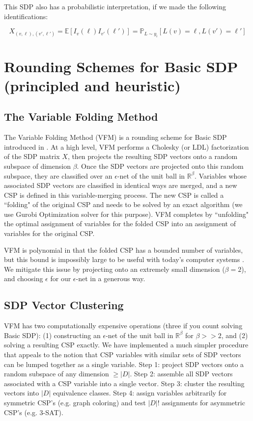 \documentclass[12pt]{article} %
\begin{document}
This SDP also has a probabilistic interpretation, if we made the following identifications:

\begin{equation}
X_{(v,\ell),(v',\ell')} = \mathbb{E}[I_v(\ell)I_{v'}(\ell')] = \mathbb{P}_{L\sim y_i}[L(v)=\ell, L(v')=\ell']
\end{equation}

\section{Rounding Schemes for Basic SDP (principled and heuristic)}


\subsection{The Variable Folding Method}

The Variable Folding Method (VFM) is a rounding scheme for Basic SDP introduced in \citet{raghavendra2009round}. At a high level, VFM performs a Cholesky (or LDL) factorization of the SDP matrix $X$, then projects the resulting SDP vectors onto a random subspace of dimension $\beta$. Once the SDP vectors are projected onto this random subspace, they are classified over an $\epsilon$-net of the unit ball in $\mathbb{R}^\beta$. Variables whose associated SDP vectors are classified in identical ways are merged, and a new CSP is defined in this variable-merging process. The new CSP is called a ``folding" of the original CSP and needs to be solved by an exact algorithm (we use Gurobi Optimization solver for this purpose). VFM completes by ``unfolding" the optimal assignment of variables for the folded CSP into an assignment of variables for the original CSP.

VFM is polynomial in that the folded CSP has a bounded number of variables, but this bound is impossibly large to be useful with today's computer systems \citep{dwivedi2015introduction}. We mitigate this issue by projecting onto an extremely small dimension ($\beta = 2$), and choosing $\epsilon$ for our $\epsilon$-net in a generous way.

\subsection{SDP Vector Clustering}

VFM has two computationally expensive operations (three if you count solving Basic SDP): (1) constructing an $\epsilon$-net of the unit ball in $\mathbb{R}^\beta$ for $\beta>>2$, and (2) solving a resulting CSP exactly. We have implemented a much simpler procedure that appeals to the notion that CSP variables with similar sets of SDP vectors can be lumped together as a single variable. Step 1: project SDP vectors onto a random subspace of any dimension $\geq |D|$. Step 2: assemble all SDP vectors associated with a CSP variable into a single vector. Step 3: cluster the resulting vectors into $|D|$ equivalence classes. Step 4: assign variables arbitrarily for symmetric CSP's (e.g. graph coloring) and test $|D|!$ assignments for asymmetric CSP's (e.g. 3-SAT).
\end{document}
